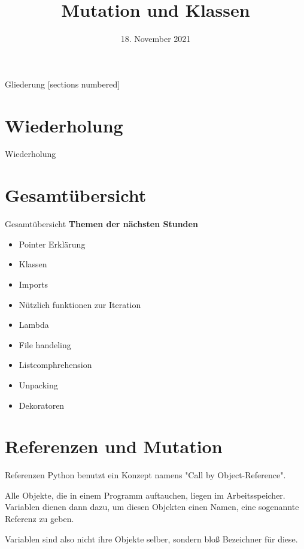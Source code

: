 



\title{Mutation und Klassen}
\date{18. November 2021}


	
\maketitle

\begin{frame}{Gliederung}
	[sections numbered]
	\tableofcontents
\end{frame}

\section{Wiederholung}
\begin{frame}{Wiederholung}
	
\end{frame}

\section{Gesamtübersicht}
\begin{frame}{Gesamtübersicht}
	\textbf{Themen der nächsten Stunden}
	\begin{itemize}
		\item Pointer Erklärung
		\item Klassen
		\item Imports
		\item Nützlich funktionen zur Iteration
		\item Lambda
		\item File handeling
		\item Listcomphrehension
		\item Unpacking
		\item Dekoratoren
	\end{itemize}
\end{frame}

\section{Referenzen und Mutation}
\begin{frame}{Referenzen}
	Python benutzt ein Konzept namens \alert{"Call by Object-Reference"}. 
	
	Alle Objekte, die in einem Programm auftauchen, liegen im Arbeitsspeicher. Variablen dienen dann dazu, um diesen Objekten einen Namen, eine sogenannte \alert{Referenz} zu geben. 
	
	Variablen sind also nicht ihre Objekte selber, sondern bloß Bezeichner für diese.
\end{frame}

